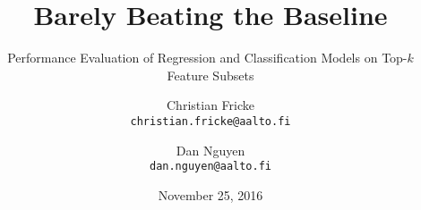 
\title{Barely Beating the Baseline}
\subtitle{Performance Evaluation of Regression and Classification Models on
  Top-$k$ Feature Subsets}

\author{
  \large Christian Fricke\\[-.2em]
  \texttt{\normalsize christian.fricke@aalto.fi}
  \and
  \large Dan Nguyen\\[-.2em]
  \texttt{\normalsize dan.nguyen@aalto.fi}
}

\date{\large November 25, 2016}

\maketitle

